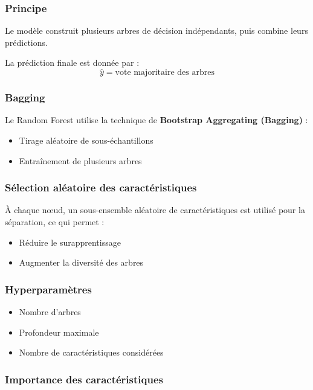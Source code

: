 \documentclass[12pt,a4paper]{article}
\begin{document}
    \subsubsection{Principe}

    Le modèle construit plusieurs arbres de décision indépendants, puis combine leurs prédictions.

    La prédiction finale est donnée par :
    \[
    \hat{y} = \text{vote majoritaire des arbres}
    \]

    \subsubsection{Bagging}

    Le Random Forest utilise la technique de \textbf{Bootstrap Aggregating (Bagging)} :
    \begin{itemize}
        \item Tirage aléatoire de sous-échantillons
        \item Entraînement de plusieurs arbres
    \end{itemize}

    \subsubsection{Sélection aléatoire des caractéristiques}

    À chaque nœud, un sous-ensemble aléatoire de caractéristiques est utilisé pour la séparation, ce qui permet :
    \begin{itemize}
        \item Réduire le surapprentissage
        \item Augmenter la diversité des arbres
    \end{itemize}

    \subsubsection{Hyperparamètres}

    \begin{itemize}
        \item Nombre d’arbres
        \item Profondeur maximale
        \item Nombre de caractéristiques considérées
    \end{itemize}

    \subsubsection{Importance des caractéristiques}
\end{document}
